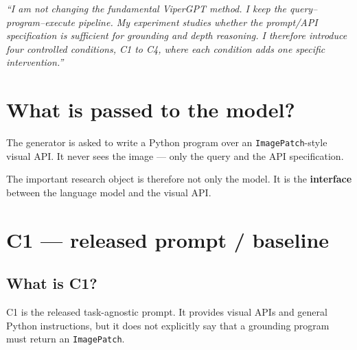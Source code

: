 \documentclass[11pt,a4paper]{article}
\begin{document}
\begin{callout}
\emph{``I am not changing the fundamental ViperGPT method. I keep the
query--program--execute pipeline. My experiment studies whether the prompt/API
specification is sufficient for grounding and depth reasoning. I therefore introduce
four controlled conditions, C1 to C4, where each condition adds one specific
intervention.''}
\end{callout}

\section{What is passed to the model?}

The generator is asked to write a Python program over an \texttt{ImagePatch}-style
visual API. It never sees the image --- only the query and the API specification.

\begin{center}
\end{center}

The important research object is therefore not only the model. It is the
\textbf{interface} between the language model and the visual API.

\section{C1 --- released prompt / baseline}

\subsection{What is C1?}

C1 is the released task-agnostic prompt. It provides visual APIs and general Python
instructions, but it does not explicitly say that a grounding program must return an
\texttt{ImagePatch}.
\end{document}
